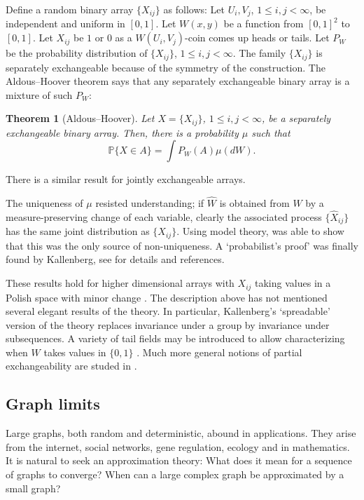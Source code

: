\documentclass[11pt,reqno,tbtags]{amsart}
\numberwithin{equation}{section}
\newtheorem{theorem}{Theorem}[section]
\theoremstyle{definition}
\theoremstyle{remark}
\renewcommand\P{\operatorname{\mathbb P{}}}
\renewcommand{\=}{:=}
\begin{document}
Define a random binary array $\{ X_{ij} \}$ as follows: Let $U_i, V_j$,
$1 \leq i,j < \infty$, be independent and uniform in $[0,1]$. Let
$W(x,y)$ be a function from $[0,1]^2$ to $[0,1]$. Let $X_{ij}$ be $1$
or $0$ as a $W(U_i, V_j)$-coin comes up heads or tails. Let $P_W$ be
the probability distribution of $\{ X_{ij} \}$, $1 \leq i,j <
\infty$. The family $\{ X_{ij} \}$ is separately exchangeable because of
the symmetry of the construction. The Aldous--Hoover theorem says that
any separately exchangeable binary array is a mixture of such $P_W$:
\begin{theorem}[Aldous--Hoover]
Let $X = \{ X_{ij} \}$, $1 \leq i,j < \infty$, be a separately exchangeable
binary array. Then, there is a probability $\mu$ such that
\begin{equation*}
\P \{ X \in A \} = \int P_W (A) \mu (dW).
\end{equation*}
\end{theorem}

There is a similar result for jointly exchangeable arrays. 

The uniqueness of $\mu$ resisted understanding; if $\widehat W$ is
obtained from $W$ by a measure-preserving change of each variable,
clearly the associated process $\{ \widehat{X}_{ij} \}$ has the same joint
distribution as $\{ X_{ij} \}$. Using model theory, \citet{Hoover} was able to
show that this was the only source of non-uniqueness. A `probabilist's
proof' was finally found by Kallenberg, see 
\citep[Sect.~7.6]{Kallenberg:exch} 
for details and
references.


These results hold for higher dimensional arrays with $X_{ij}$ taking
values in a Polish space with minor change
\citep[Chap.~7]{Kallenberg:exch}. The description above has not
mentioned several elegant results of the theory. In particular,
Kallenberg's `spreadable' version of the theory replaces invariance
under a group by invariance under subsequences. A variety of tail
fields may be introduced to allow characterizing when $W$ takes
values in $\{ 0,1 \}$ \citep[Sect.~4]{DF1981}. Much more
general notions of partial exchangeability are studed in \cite{DF1984}.

\subsection{Graph limits}\label{secB}

Large graphs, both random and deterministic, abound in
applications. They arise from the internet, social networks, gene
regulation, ecology and in mathematics. It is natural to seek an
approximation theory: What does it mean for a sequence of graphs to
converge? When can a large complex graph be approximated by a small
graph?
\end{document}
